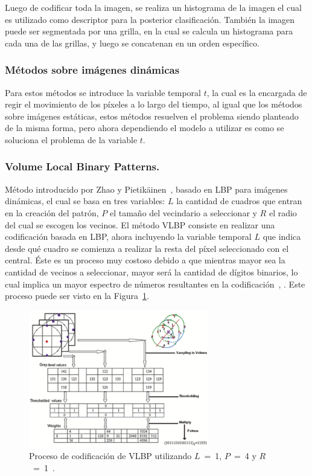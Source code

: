 		Luego de codificar toda la imagen, se realiza un histograma de la imagen el cual es utilizado como descriptor para la posterior clasificación. También la imagen puede ser segmentada por una grilla, en la cual se calcula un histograma para cada una de las grillas, y luego se concatenan en un orden específico.

	\subsubsection{Métodos sobre imágenes dinámicas}	
	\label{sec:met_videos}
	Para estos métodos se introduce la variable temporal $t$, la cual es la encargada de regir el movimiento de los píxeles a lo largo del tiempo, al igual que los métodos sobre imágenes estáticas, estos métodos resuelven el problema siendo planteado de la misma forma, pero ahora dependiendo el modelo a utilizar es como se soluciona el problema de la variable $t$.

		\subsubsection{Volume Local Binary Patterns.}
		\label{sec:vlbp}
		Método introducido por Zhao y Pietikäinen~\cite{Zhao2006}, basado en LBP para imágenes dinámicas, el cual se basa en tres variables: $L$ la cantidad de cuadros que entran en la creación del patrón, $P$ el tamaño del vecindario a seleccionar y $R$ el radio del cual se escogen los vecinos. 
El método VLBP consiste en realizar una codificación basada en LBP, ahora incluyendo la variable temporal $L$ que indica desde qué cuadro se comienza a realizar la resta del píxel seleccionado con el central.
Éste es un proceso muy costoso debido a que mientras mayor sea la cantidad de vecinos a seleccionar, mayor será la cantidad de dígitos binarios, lo cual implica un mayor espectro de números resultantes en la codificación~\cite{Zhao2007a}, \cite{Zhao2007}. Este proceso puede ser visto en la Figura~\ref{art:fig:vlbp}.

\begin{figure}[tb]
  \centering
   \includegraphics[width=0.7\textwidth]{Figuras/vlbp.pdf}
  \caption{Proceso de codificación de VLBP utilizando $L$~=~1, $P$~=~4 y $R$~=~1~\cite{Zhao2007}.}
  \label{art:fig:vlbp}
\end{figure}


